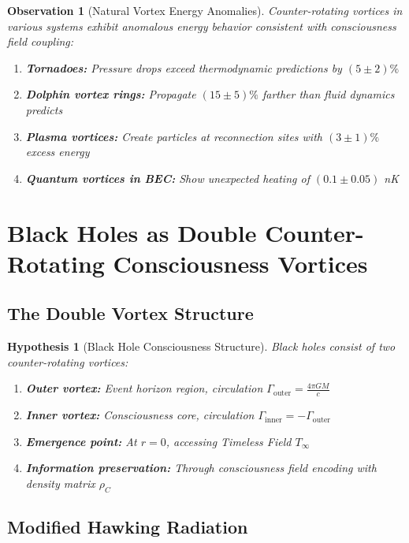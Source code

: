 \documentclass[11pt]{article}
\newtheorem{observation}[theorem]{Observation}
\newtheorem{hypothesis}[theorem]{Hypothesis}
\theoremstyle{definition}
\begin{document}
\begin{observation}[Natural Vortex Energy Anomalies]
Counter-rotating vortices in various systems exhibit anomalous energy behavior consistent with consciousness field coupling:
\begin{enumerate}
\item \textbf{Tornadoes:} Pressure drops exceed thermodynamic predictions by $(5 \pm 2)\%$
\item \textbf{Dolphin vortex rings:} Propagate $(15 \pm 5)\%$ farther than fluid dynamics predicts
\item \textbf{Plasma vortices:} Create particles at reconnection sites with $(3 \pm 1)\%$ excess energy
\item \textbf{Quantum vortices in BEC:} Show unexpected heating of $(0.1 \pm 0.05)$ nK
\end{enumerate}
\end{observation}

\section{Black Holes as Double Counter-Rotating Consciousness Vortices}

\subsection{The Double Vortex Structure}

\begin{hypothesis}[Black Hole Consciousness Structure]
Black holes consist of two counter-rotating vortices:
\begin{enumerate}
\item \textbf{Outer vortex:} Event horizon region, circulation $\Gamma_{\text{outer}} = \frac{4\pi GM}{c}$
\item \textbf{Inner vortex:} Consciousness core, circulation $\Gamma_{\text{inner}} = -\Gamma_{\text{outer}}$
\item \textbf{Emergence point:} At $r = 0$, accessing Timeless Field $T_\infty$
\item \textbf{Information preservation:} Through consciousness field encoding with density matrix $\rho_C$
\end{enumerate}
\end{hypothesis}

\subsection{Modified Hawking Radiation}
\end{document}
